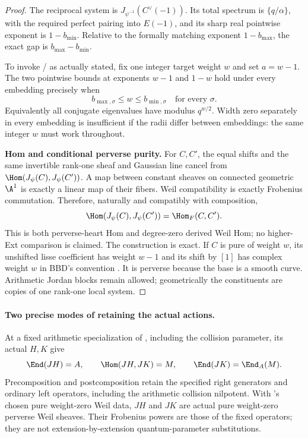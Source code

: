 \begin{proof}
The reciprocal system is
$J_{\psi^{-1}}(C^\vee(-1))$. Its total spectrum is
$\{q/\alpha\}$, with the required perfect pairing into
$E(-1)$, and its sharp real pointwise exponent is
$1-b_{\min}$. Relative to the formally matching exponent
$1-b_{\max}$, the exact gap is $b_{\max}-b_{\min}$.

To invoke / as actually stated, fix one
integer target weight $w$ and set $a=w-1$.
The two pointwise bounds at exponents $w-1$ and $1-w$
hold under every embedding precisely when
\begin{equation}\label{eq:gausscommonweight}
 b_{\max,\sigma}\le w\le b_{\min,\sigma}
                    \quad\text{for every }\sigma.
\end{equation}
Equivalently all conjugate eigenvalues have modulus
$q^{w/2}$. Width zero separately in every embedding is
insufficient if the radii differ between embeddings:
the same integer $w$ must work throughout.

\par\smallskip\noindent\textbf{Hom and conditional perverse purity.}\quad
For $C,C'$, the equal shifts and the same invertible
rank-one sheaf and Gaussian line cancel from
$\Hom(J_\psi(C),J_\psi(C'))$. A map between constant
sheaves on connected geometric $\A^1$ is exactly a
linear map of their fibers. Weil compatibility is exactly
Frobenius commutation. Therefore, naturally and
compatibly with composition,
\[
 \Hom(J_\psi(C),J_\psi(C'))=\Hom_F(C,C').
\]
This is both perverse-heart Hom and degree-zero derived
Weil Hom; no higher-Ext comparison is claimed.
The construction is exact. If $C$ is pure of weight $w$,
its unshifted lisse coefficient has weight $w-1$ and its
shift by $[1]$ has complex weight $w$ in BBD's convention
\cite[5.1.8, pp.~126--127]{BBD}.
It is perverse because the base is a smooth curve.
Arithmetic Jordan blocks remain allowed; geometrically
the constituents are copies of one rank-one local system.
\end{proof}

\paragraph{Two precise modes of retaining the actual actions.}
At a fixed arithmetic specialization of , including
the collision parameter, its actual $H,K$ give
\[
 \End(JH)=A,\qquad \Hom(JH,JK)=M,\qquad
 \End(JK)=\End_A(M).
\]
Precomposition and postcomposition retain the specified
right generators and ordinary left operators, including
the arithmetic collision nilpotent. With 's
chosen pure weight-zero Weil data, $JH$ and $JK$ are
actual pure weight-zero perverse Weil sheaves.
Their Frobenius powers are those of the fixed operators;
they are not extension-by-extension quantum-parameter
substitutions.

